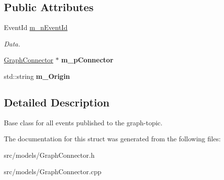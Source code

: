 \subsection*{Public Attributes}
\begin{DoxyCompactItemize}
\item 
\mbox{\label{struct_graph_connector_1_1_i_graph_event_ae63bd1a184c986be34299ab0dcf431eb}} 
Event\+Id \hyperlink{struct_graph_connector_1_1_i_graph_event_ae63bd1a184c986be34299ab0dcf431eb}{m\+\_\+n\+Event\+Id}
\begin{DoxyCompactList}\small\item\em Data. \end{DoxyCompactList}\item 
\mbox{\label{struct_graph_connector_1_1_i_graph_event_a8cb28e151df47d468b062d6bd863c7f1}} 
\hyperlink{class_graph_connector}{Graph\+Connector} $\ast$ {\bfseries m\+\_\+p\+Connector}
\item 
\mbox{\label{struct_graph_connector_1_1_i_graph_event_ada9b84948a2e66e64001edd5a0cc5891}} 
std\+::string {\bfseries m\+\_\+\+Origin}
\end{DoxyCompactItemize}


\subsection{Detailed Description}
Base class for all events published to the graph-\/topic. 

The documentation for this struct was generated from the following files\+:\begin{DoxyCompactItemize}
\item 
src/models/Graph\+Connector.\+h\item 
src/models/Graph\+Connector.\+cpp\end{DoxyCompactItemize}
